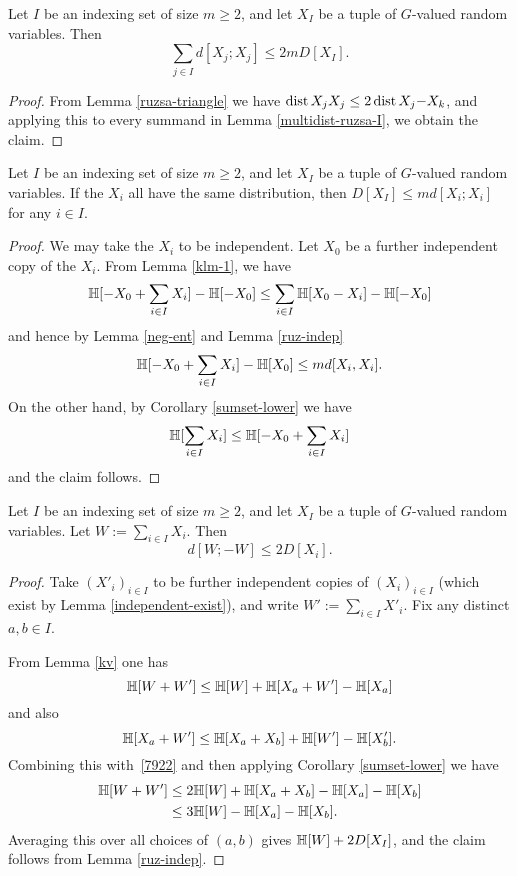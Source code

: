 \begin{lemma}\label{multidist-ruzsa-II}
  Let $I$ be an indexing set of size $m \ge 2$, and let $X_{I}$ be a tuple of $G$-valued random variables. Then
  $$\sum_{j \in I} d[X_j;X_j] \leq 2 m D[X_I].$$
\end{lemma}

\begin{proof}
From Lemma \ref{ruzsa-triangle} we have $\operatorname{dist}{X_j}{X_j} \leq 2 \operatorname{dist}{X_j}{-X_k}$, and applying this to every summand in Lemma \ref{multidist-ruzsa-I}, we obtain the claim.
\end{proof}

\begin{lemma}\label{multidist-ruzsa-III}
  Let $I$ be an indexing set of size $m \ge 2$, and let $X_{I}$ be a tuple of $G$-valued random variables. If the $X_i$ all have the same distribution, then $D[X_I] \leq m d[X_i;X_i]$ for any $i \in I$.
\end{lemma}

\begin{proof}
  We may take the $X_i$ to be independent.  Let $X_0$ be a further independent copy of the $X_i$.
From Lemma \ref{klm-1}, we have
$$ \mathbb{H}[-X_0 + \sum_{i \in I} X_i] - \mathbb{H}[-X_0] \leq \sum_{i \in I} \mathbb{H}[X_0 - X_i] - \mathbb{H}[-X_0]$$
and hence by Lemma \ref{neg-ent} and Lemma \ref{ruz-indep}
$$ \mathbb{H}[-X_0 + \sum_{i \in I} X_i] - \mathbb{H}[X_0] \leq m d[X_i,X_i].$$
On the other hand, by Corollary \ref{sumset-lower} we have
$$ \mathbb{H}[\sum_{i \in I} X_i] \leq \mathbb{H}[-X_0 + \sum_{i \in I} X_i]$$
and the claim follows.
\end{proof}

\begin{lemma}\label{multidist-ruzsa-IV}
  Let $I$ be an indexing set of size $m \ge 2$, and let $X_{I}$ be a tuple of $G$-valued random variables.  Let $W := \sum_{i \in I} X_i$. Then
  $$ d[W;-W] \leq 2 D[X_i].$$
\end{lemma}

\begin{proof}
  Take $(X'_i)_{i \in I}$ to be further independent copies of $(X_i)_{i \in I}$ (which exist by Lemma \ref{independent-exist}), and write $W' := \sum_{i \in I} X'_i$.
  Fix any distinct $a,b \in I$.

  From Lemma \ref{kv} one has
  \begin{equation}\label{7922}
    \mathbb{H}[W + W'] \leq  \mathbb{H}[W] + \mathbb{H}[X_{a} + W'] - \mathbb{H}[X_{a}]
   \end{equation}
   and also
   \[ \mathbb{H}[X_a + W'] \leq \mathbb{H}[X_a + X_b] + \mathbb{H}[W'] - \mathbb{H}[X'_b].\]
   Combining this with~\eqref{7922} and then applying Corollary \ref{sumset-lower} we have
   \begin{align*}  \mathbb{H}[W + W']  & \leq    2\mathbb{H}[W] + \mathbb{H}[X_a + X_b]  - \mathbb{H}[X_a] - \mathbb{H}[X_b] \\ & \leq
    3 \mathbb{H}[W] - \mathbb{H}[X_a] - \mathbb{H}[X_b].
  \end{align*}
  Averaging this over all choices of $(a,b)$ gives $\mathbb{H}[W] + 2 D[X_I]$, and the claim follows from Lemma \ref{ruz-indep}.
\end{proof}

